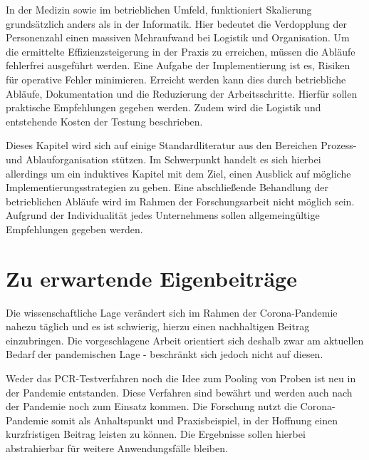 In der Medizin sowie im betrieblichen Umfeld, funktioniert Skalierung grundsätzlich anders als in der Informatik.
Hier bedeutet die Verdopplung der Personenzahl einen massiven Mehraufwand bei Logistik und Organisation.
Um die ermittelte Effizienzsteigerung in der Praxis zu erreichen, müssen die Abläufe fehlerfrei ausgeführt werden.
Eine Aufgabe der Implementierung ist es, Risiken für operative Fehler minimieren.
Erreicht werden kann dies durch betriebliche Abläufe, Dokumentation und die Reduzierung der Arbeitsschritte.
Hierfür sollen praktische Empfehlungen gegeben werden.
Zudem wird die Logistik und entstehende Kosten der Testung beschrieben.

Dieses Kapitel wird sich auf einige Standardliteratur aus den Bereichen Prozess- und Ablauforganisation stützen.
Im Schwerpunkt handelt es sich hierbei allerdings um ein induktives Kapitel mit dem Ziel, einen Ausblick auf mögliche Implementierungsstrategien zu geben.
Eine abschließende Behandlung der betrieblichen Abläufe wird im Rahmen der Forschungsarbeit nicht möglich sein.
Aufgrund der Individualität jedes Unternehmens sollen allgemeingültige Empfehlungen gegeben werden.

\section{Zu erwartende Eigenbeiträge}
Die wissenschaftliche Lage verändert sich im Rahmen der Corona-Pandemie nahezu täglich und es ist schwierig, hierzu einen nachhaltigen Beitrag einzubringen.
Die vorgeschlagene Arbeit orientiert sich deshalb zwar am aktuellen Bedarf der pandemischen Lage - beschränkt sich jedoch nicht auf diesen.

Weder das PCR-Testverfahren noch die Idee zum Pooling von Proben ist neu in der Pandemie entstanden.
Diese Verfahren sind bewährt und werden auch nach der Pandemie noch zum Einsatz kommen.
Die Forschung nutzt die Corona-Pandemie somit als Anhaltspunkt und Praxisbeispiel, in der Hoffnung einen kurzfristigen Beitrag leisten zu können.
Die Ergebnisse sollen hierbei abstrahierbar für weitere Anwendungsfälle bleiben.
